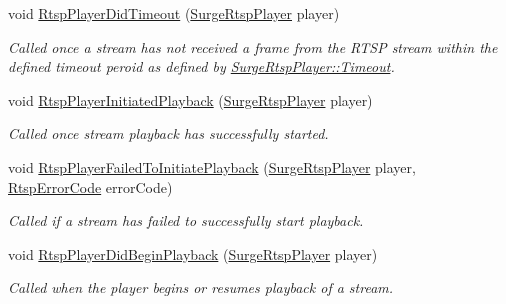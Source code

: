 \begin{DoxyCompactItemize}
\item 
void \hyperlink{interface_surge_xamarini_o_s_bindings_1_1_surge_rtsp_player_delegate_a090498b65f3da84477fc9486e24235a4}{Rtsp\+Player\+Did\+Timeout} (\hyperlink{interface_surge_xamarini_o_s_bindings_1_1_surge_rtsp_player}{Surge\+Rtsp\+Player} player)
\begin{DoxyCompactList}\small\item\em Called once a stream has not received a frame from the R\+T\+SP stream within the defined timeout peroid as defined by \hyperlink{interface_surge_xamarini_o_s_bindings_1_1_surge_rtsp_player_a5d41ebac63bbd4c26859615abcf1fa0e}{Surge\+Rtsp\+Player\+::\+Timeout}. \end{DoxyCompactList}\item 
void \hyperlink{interface_surge_xamarini_o_s_bindings_1_1_surge_rtsp_player_delegate_a086947a6da6d523853a8cfacd4be654a}{Rtsp\+Player\+Initiated\+Playback} (\hyperlink{interface_surge_xamarini_o_s_bindings_1_1_surge_rtsp_player}{Surge\+Rtsp\+Player} player)
\begin{DoxyCompactList}\small\item\em Called once stream playback has successfully started. \end{DoxyCompactList}\item 
void \hyperlink{interface_surge_xamarini_o_s_bindings_1_1_surge_rtsp_player_delegate_a3042de09c8d096bb37d7e3d0373ab449}{Rtsp\+Player\+Failed\+To\+Initiate\+Playback} (\hyperlink{interface_surge_xamarini_o_s_bindings_1_1_surge_rtsp_player}{Surge\+Rtsp\+Player} player, \hyperlink{namespace_surge_xamarini_o_s_bindings_af9fd93680b94cd5a99c018ef98b65ec2}{Rtsp\+Error\+Code} error\+Code)
\begin{DoxyCompactList}\small\item\em Called if a stream has failed to successfully start playback. \end{DoxyCompactList}\item 
void \hyperlink{interface_surge_xamarini_o_s_bindings_1_1_surge_rtsp_player_delegate_ad4dabfca0a807a5d2e5edb1c0325379d}{Rtsp\+Player\+Did\+Begin\+Playback} (\hyperlink{interface_surge_xamarini_o_s_bindings_1_1_surge_rtsp_player}{Surge\+Rtsp\+Player} player)
\begin{DoxyCompactList}\small\item\em Called when the player begins or resumes playback of a stream. \end{DoxyCompactList}\item 

\end{DoxyCompactItemize}
